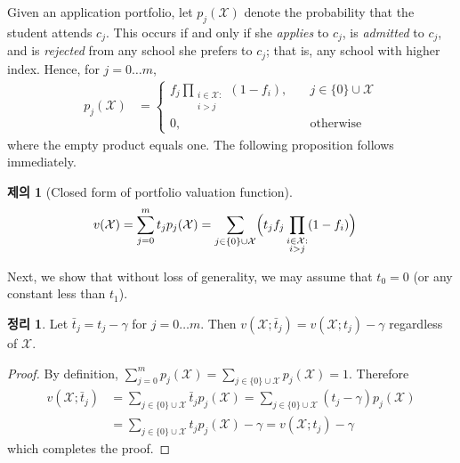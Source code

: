 \documentclass[12pt]{article} %
\newtheorem{theorem}{Theorem}
\newtheorem{proposition}{Proposition}
\theoremstyle{definition}
\newtheorem{theorem}{정리}
\newtheorem{proposition}{제의}
\theoremstyle{definition}
\begin{document}
Given an application portfolio, let $p_j(\mathcal{X})$ denote the probability that the student attends $c_j$. This occurs if and only if she \emph{applies} to $c_j$, is \emph{admitted} to $c_j$, and is \emph{rejected} from any school she prefers to $c_j$; that is, any school with higher index. Hence, for $j= 0\dots m$,
\begin{align}
p_j(\mathcal{X}) &= 
\begin{cases}
\displaystyle f_j  \prod_{\substack{i \in \mathcal{X}: \\ i > j}} (1 - f_{i}), \quad & j \in \{0\}\cup\mathcal{X}\\
0, \quad & \text{otherwise}
\end{cases} 
\end{align}
where the empty product equals one. The following proposition follows immediately.

\begin{proposition}[Closed form of portfolio valuation function]
\begin{align}
v(\mathcal{X}) &= \sum_{j=0}^m t_j p_j(\mathcal{X}) = \sum_{j\in\{0\}\cup\mathcal{X}} \Bigl( t_j f_j  \prod_{\substack{i \in \mathcal{X}: \\ i > j}} (1 - f_{i}) \Bigr)  \label{closedformportfoliovaluationX}%
\end{align}
\end{proposition}

Next, we show that without loss of generality, we may assume that $t_0 = 0$ (or any constant less than $t_1$).
\begin{theorem} \label{assumetzerozero}
Let $\bar t_j = t_j - \gamma$ for $j = 0 \dots m$. Then $v(\mathcal{X}; \bar t_j) = v(\mathcal{X};  t_j) -  \gamma$ regardless of $\mathcal{X}$. 
\end{theorem}
\begin{proof}
By definition, $\sum_{j=0}^m p_j(\mathcal{X}) = \sum_{j \in \{0\}\cup\mathcal{X}} p_j(\mathcal{X}) = 1$. Therefore
\begin{align}
v(\mathcal{X}; \bar t_j) &= \sum_{j\in \{0\}\cup\mathcal{X}}  \bar t_j p_j(\mathcal{X})
=\sum_{j\in \{0\}\cup\mathcal{X}} (t_j - \gamma) p_j(\mathcal{X}) \\
&=\sum_{j\in \{0\}\cup\mathcal{X}} t_j p_j(\mathcal{X})  - \gamma 
= v(\mathcal{X}; t_j) - \gamma
\end{align}
which completes the proof. 
\end{proof}
\end{document}
